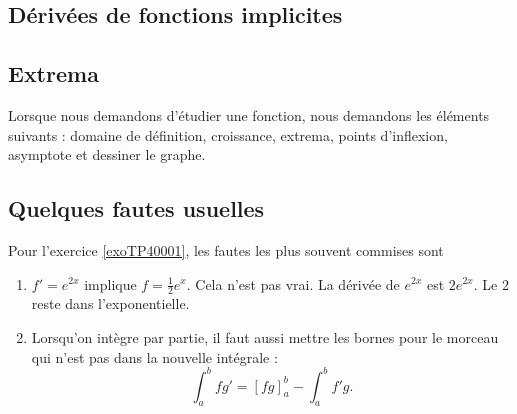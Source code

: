 \subsection{Dérivées de fonctions implicites}

\subsection{Extrema}


Lorsque nous demandons d'étudier une fonction, nous demandons les éléments suivants : domaine de définition, croissance, extrema, points d'inflexion, asymptote et dessiner le graphe.



\subsection{Quelques fautes usuelles}

Pour l'exercice \ref{exoTP40001}, les fautes les plus souvent commises sont
\begin{enumerate}

	\item
		$f'= e^{2x}$ implique $f=\frac{1}{ 2 } e^{x}$. Cela n'est pas vrai. La dérivée de $ e^{2x}$ est $2 e^{2x}$. Le $2$ reste dans l'exponentielle.

	\item
		Lorsqu'on intègre par partie, il faut aussi mettre les bornes pour le morceau qui n'est pas dans la nouvelle intégrale :
		\begin{equation}
			\int_a^b fg'=[fg]_a^b-\int_a^bf'g.
		\end{equation}
\end{enumerate}


